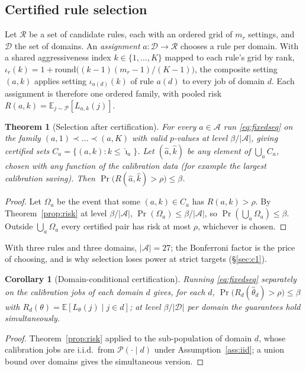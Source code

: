 \documentclass[3p,twocolumn,10pt]{elsarticle}
\newtheorem{theorem}{Theorem}
\newtheorem{corollary}{Corollary}
\theoremstyle{definition}
\begin{document}
\subsection{Certified rule selection}
Let $\mathcal{R}$ be a set of candidate rules, each with an ordered grid of $m_r$ settings, and $\mathcal{D}$ the set of domains. An \emph{assignment} $a:\mathcal{D}\to\mathcal{R}$ chooses a rule per domain. With a shared aggressiveness index $k\in\{1,\dots,K\}$ mapped to each rule's grid by rank, $\iota_r(k)=1+\mathrm{round}\big((k-1)(m_r-1)/(K-1)\big)$, the composite setting $(a,k)$ applies setting $\iota_{a(d)}(k)$ of rule $a(d)$ to every job of domain $d$. Each assignment is therefore one ordered family, with pooled risk $R(a,k)=\mathbb{E}_{j\sim\mathcal{P}}[L_{a,k}(j)]$.

\begin{theorem}[Selection after certification]
\label{thm:select}
For every $a\in\mathcal{A}$ run \eqref{eq:fixedseq} on the family $(a,1)\prec\dots\prec(a,K)$ with valid $p$-values at level $\beta/|\mathcal{A}|$, giving certified sets $C_a=\{(a,k):k\le\hat\imath_a\}$. Let $(\hat a,\hat k)$ be \emph{any} element of $\bigcup_aC_a$, chosen with any function of the calibration data (for example the largest calibration saving). Then $\Pr\big(R(\hat a,\hat k)>\rho\big)\le\beta$.
\end{theorem}
\begin{proof}
Let $\Omega_a$ be the event that some $(a,k)\in C_a$ has $R(a,k)>\rho$. By Theorem~\ref{prop:risk} at level $\beta/|\mathcal{A}|$, $\Pr(\Omega_a)\le\beta/|\mathcal{A}|$, so $\Pr(\bigcup_a\Omega_a)\le\beta$. Outside $\bigcup_a\Omega_a$ every certified pair has risk at most $\rho$, whichever is chosen.
\end{proof}

\noindent With three rules and three domains, $|\mathcal{A}|=27$; the Bonferroni factor is the price of choosing, and is why selection loses power at strict targets (\S\ref{sec:c1}).

\begin{corollary}[Domain-conditional certification]
\label{cor:mondrian}
Running \eqref{eq:fixedseq} separately on the calibration jobs of each domain $d$ gives, for each $d$, $\Pr\big(R_d(\hat\theta_d)>\rho\big)\le\beta$ with $R_d(\theta)=\mathbb{E}[L_\theta(j)\mid j\in d]$; at level $\beta/|\mathcal{D}|$ per domain the guarantees hold simultaneously.
\end{corollary}
\begin{proof}
Theorem~\ref{prop:risk} applied to the sub-population of domain $d$, whose calibration jobs are i.i.d.\ from $\mathcal{P}(\cdot\mid d)$ under Assumption~\ref{ass:iid}; a union bound over domains gives the simultaneous version.
\end{proof}
\end{document}
